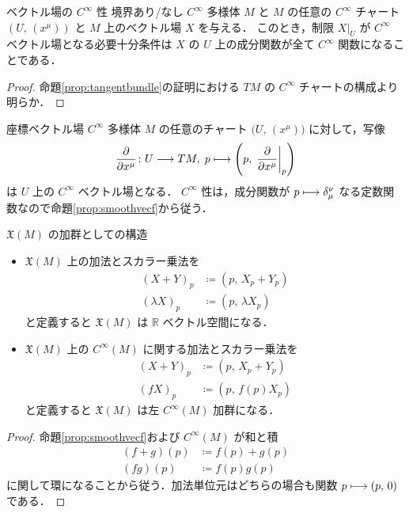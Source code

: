 \documentclass[geometry_main]{subfiles}
\begin{document}
\begin{myprop}[label=prop:smoothvecf]{ベクトル場の $C^\infty$ 性}
    境界あり/なし $C^\infty$ 多様体 $M$ と $M$ の任意の $C^\infty$ チャート $(U,\, (x^\mu))$ と $M$ 上のベクトル場 $X$ を与える．
    このとき，制限 $X|_U$ が $C^\infty$ ベクトル場となる必要十分条件は $X$ の $U$ 上の成分関数が全て $C^\infty$ 関数になることである．
\end{myprop}

\begin{proof}
    命題\ref{prop:tangentbundle}の証明における $TM$ の $C^\infty$ チャートの構成より明らか．
\end{proof}

\begin{myexample}[label=def:coord-vecf]{座標ベクトル場}
    $C^\infty$ 多様体 $M$ の任意のチャート $\bigl( U,\, (x^\mu) \bigr)$ に対して，写像
    \begin{align}
        \pdv{}{x^\mu} \colon U \lto TM,\; p \lmto \left(p,\, \eval{\pdv{}{x^\mu}}_p\right)
    \end{align}
    は $U$ 上の $C^\infty$ ベクトル場となる．
    $C^\infty$ 性は，成分関数が $p \longmapsto \delta^\nu_\mu$ なる定数関数なので命題\ref{prop:smoothvecf}から従う．
\end{myexample}

\begin{myprop}[label=prop:vecf-module]{$\mathfrak{X}(M)$ の加群としての構造}
    \begin{itemize}
        \item $\mathfrak{X}(M)$ 上の加法とスカラー乗法を
        \begin{align}
            (X + Y)_p &\coloneqq (p,\, X_p + Y_p) \\
            (\lambda X)_p &\coloneqq (p,\, \lambda X_p)
        \end{align}
        と定義すると $\mathfrak{X}(M)$ は $\mathbb{R}$ ベクトル空間になる．
        \item $\mathfrak{X}(M)$ 上の $C^\infty (M)$ に関する加法とスカラー乗法を
        \begin{align}
            (X + Y)_p &\coloneqq (p,\, X_p + Y_p) \\
            (f X)_p &\coloneqq (p,\, f(p) X_p)
        \end{align}
        と定義すると $\mathfrak{X}(M)$ は左 $C^\infty (M)$ 加群になる．
    \end{itemize}
\end{myprop}

\begin{proof}
    命題\ref{prop:smoothvecf}および $C^\infty(M)$ が和と積
    \begin{align}
        (f + g)(p) &\coloneqq f(p) + g(p) \\
        (fg)(p) &\coloneqq f(p) g(p)
    \end{align}
    に関して環になることから従う．加法単位元はどちらの場合も関数 $p \longmapsto (p,\, 0)$ である．
\end{proof}
\end{document}
